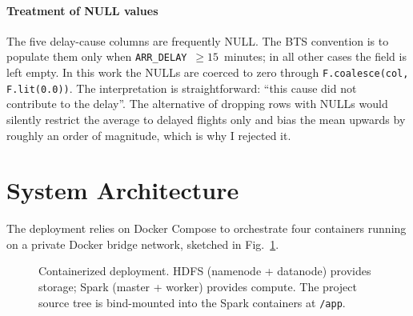 \documentclass[conference]{IEEEtran}
\begin{document}
\paragraph{Treatment of NULL values}
The five delay-cause columns are frequently NULL. The BTS
convention is to populate them only when
\texttt{ARR\_DELAY}~$\geq 15$~minutes; in all other cases the
field is left empty. In this work the NULLs are coerced to zero
through \texttt{F.coalesce(col, F.lit(0.0))}. The interpretation
is straightforward: ``this cause did not contribute to the
delay''. The alternative of dropping rows with NULLs would
silently restrict the average to delayed flights only and bias
the mean upwards by roughly an order of magnitude, which is why
I rejected it.

\section{System Architecture}\label{sec:architecture}

The deployment relies on Docker Compose to orchestrate four
containers running on a private Docker bridge network, sketched
in Fig.~\ref{fig:architecture}.

\begin{figure}[h]
\centering
{}
\caption{Containerized deployment. HDFS (namenode + datanode)
provides storage; Spark (master + worker) provides compute. The
project source tree is bind-mounted into the Spark containers at
\texttt{/app}.}
\label{fig:architecture}
\end{figure}
\end{document}
